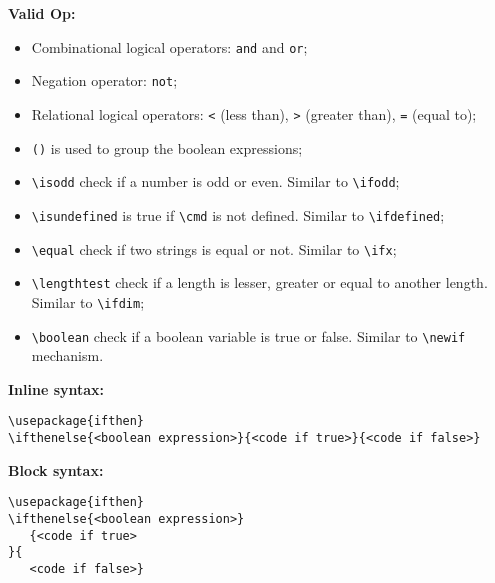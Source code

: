 \documentclass[12pt]{article}
\begin{document}
		\noindent\textbf{Valid Op:} 
		\begin{itemize}
			\item Combinational logical operators: \texttt{and} and \texttt{or};
			\item Negation operator: \texttt{not};
			\item Relational logical operators: \texttt{<} (less than), \texttt{>} (greater than), \texttt{=} (equal to);
			\item \texttt{()} is used to group the boolean expressions;
			\item \verb|\isodd| check if a number is odd or even. Similar to \verb|\ifodd|;
			\item \verb|\isundefined| is true if \verb|\cmd| is not defined. Similar to \verb|\ifdefined|;
			\item \verb|\equal| check if two strings is equal or not. Similar to \verb|\ifx|;
			\item \verb|\lengthtest| check if a length is lesser, greater or equal to another
			 length. Similar to \verb|\ifdim|;
			\item \verb|\boolean| check if a boolean variable is true or false. Similar to \verb|\newif| mechanism.
		\end{itemize}

		\noindent\textbf{Inline syntax:}
		\begin{lstlisting}
\usepackage{ifthen}
\ifthenelse{<boolean expression>}{<code if true>}{<code if false>}
		\end{lstlisting}

		\noindent\textbf{Block syntax:}
		\begin{lstlisting}
\usepackage{ifthen}
\ifthenelse{<boolean expression>}
   {<code if true>
}{
   <code if false>}
		\end{lstlisting}
\end{document}
